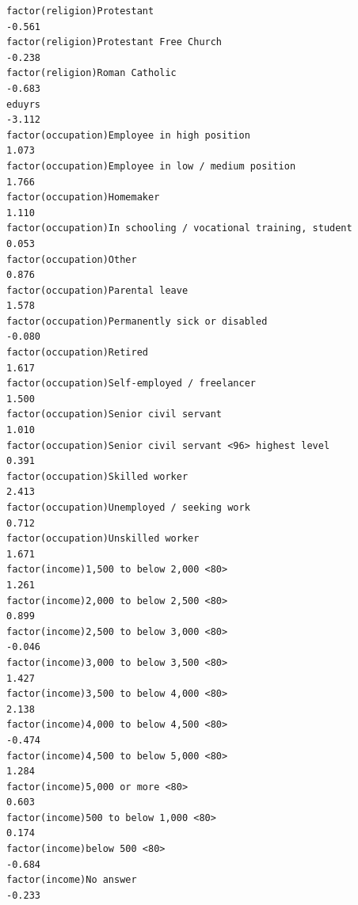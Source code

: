 \documentclass[
]{article}
\begin{document}
\begin{table}
\begin{minipage}[t]{\linewidth}
{\begin{verbatim}
factor(religion)Protestant                                                         -0.561
factor(religion)Protestant Free Church                                             -0.238
factor(religion)Roman Catholic                                                     -0.683
eduyrs                                                                             -3.112
factor(occupation)Employee in high position                                         1.073
factor(occupation)Employee in low / medium position                                 1.766
factor(occupation)Homemaker                                                         1.110
factor(occupation)In schooling / vocational training, student                       0.053
factor(occupation)Other                                                             0.876
factor(occupation)Parental leave                                                    1.578
factor(occupation)Permanently sick or disabled                                     -0.080
factor(occupation)Retired                                                           1.617
factor(occupation)Self-employed / freelancer                                        1.500
factor(occupation)Senior civil servant                                              1.010
factor(occupation)Senior civil servant <96> highest level                           0.391
factor(occupation)Skilled worker                                                    2.413
factor(occupation)Unemployed / seeking work                                         0.712
factor(occupation)Unskilled worker                                                  1.671
factor(income)1,500 to below 2,000 <80>                                             1.261
factor(income)2,000 to below 2,500 <80>                                             0.899
factor(income)2,500 to below 3,000 <80>                                            -0.046
factor(income)3,000 to below 3,500 <80>                                             1.427
factor(income)3,500 to below 4,000 <80>                                             2.138
factor(income)4,000 to below 4,500 <80>                                            -0.474
factor(income)4,500 to below 5,000 <80>                                             1.284
factor(income)5,000 or more <80>                                                    0.603
factor(income)500 to below 1,000 <80>                                               0.174
factor(income)below 500 <80>                                                       -0.684
factor(income)No answer                                                            -0.233

\end{verbatim}}
\end{minipage}
\end{table}
\end{document}
